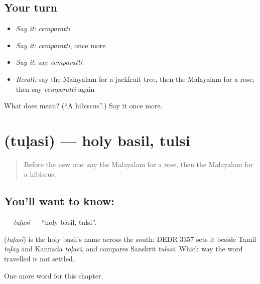 \subsection*{Your turn}
\begin{itemize}
\raggedright
  \item \emph{Say it:} \emph{cemparatti}
  \item \emph{Say it:} \emph{cemparatti}, once more
  \item \emph{Say it:} say \emph{cemparatti}
  \item \emph{Recall:} say the Malayalam for a jackfruit tree, then the Malayalam for a rose, then say \emph{cemparatti} again
\end{itemize}

\begin{tcolorbox}[breakable,colback=teal!4,colframe=teal!35!black,title={Before you move on}]
What does  mean? (\textquotedblleft{}A hibiscus\textquotedblright{}.) Say it once more.
\end{tcolorbox}
\section[\texorpdfstring{\ml{തുളസി} (tuḷasi)}{തുളസി (tuḷasi)}]{ (tuḷasi) — holy basil, tulsi}

\label{lesson:ML-C253-tulasi}



\begin{quote}
Before the new one: say the Malayalam for a rose, then the Malayalam for a hibiscus.
\end{quote}

\subsection*{You'll want to know: }
\textbf{} — \emph{tuḷasi} — \textquotedblleft{}holy basil, tulsi\textquotedblright{}.

\begin{cousinweb}
\textbf{} (\emph{tuḷasi}) is the holy basil's name across the south: DEDR 3357 sets it beside Tamil \emph{tuḻāy} and Kannada \emph{toḷaci}, and compares Sanskrit \emph{tulasī}. Which way the word travelled is not settled.
\end{cousinweb}

\begin{grammarlens}[title={What you've built}]
One more word for this chapter.
\end{grammarlens}

